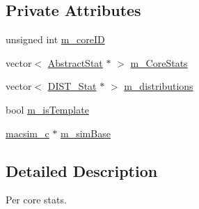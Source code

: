\subsection*{Private Attributes}
\begin{DoxyCompactItemize}
\item 
unsigned int \hyperlink{classCoreStatistics_a1474d715511078b522b00f29bfb08c99}{m\_\-coreID}
\item 
vector$<$ \hyperlink{classAbstractStat}{AbstractStat} $\ast$ $>$ \hyperlink{classCoreStatistics_a75d62886dba5d44a6b5dcd87ca9e25fc}{m\_\-CoreStats}
\item 
vector$<$ \hyperlink{classDIST__Stat}{DIST\_\-Stat} $\ast$ $>$ \hyperlink{classCoreStatistics_a4f8bb0a5353335409018ad3862d7279b}{m\_\-distributions}
\item 
bool \hyperlink{classCoreStatistics_aab80ae23a0aa22e19e3f5a2b4b4710af}{m\_\-isTemplate}
\item 
\hyperlink{classmacsim__c}{macsim\_\-c} $\ast$ \hyperlink{classCoreStatistics_ab5a729b307a516a6987f52975ad7df57}{m\_\-simBase}
\end{DoxyCompactItemize}


\subsection{Detailed Description}
Per core stats. 

